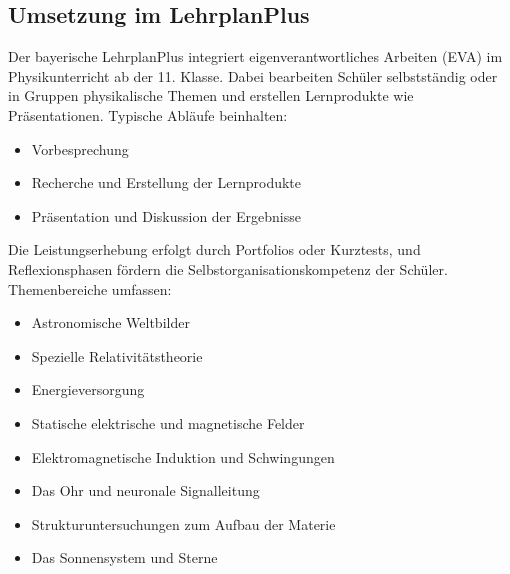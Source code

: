 \subsection{Umsetzung im LehrplanPlus}
Der bayerische LehrplanPlus integriert eigenverantwortliches Arbeiten (EVA) im Physikunterricht ab der 11. Klasse. Dabei bearbeiten Sch\"uler selbstst\"andig oder in Gruppen physikalische Themen und erstellen Lernprodukte wie Pr\"asentationen. Typische Abl\"aufe beinhalten:

\begin{itemize}
	\item Vorbesprechung
	\item Recherche und Erstellung der Lernprodukte
	\item Pr\"asentation und Diskussion der Ergebnisse
\end{itemize}

Die Leistungserhebung erfolgt durch Portfolios oder Kurztests, und Reflexionsphasen fördern die Selbstorganisationskompetenz der Sch\"uler. Themenbereiche umfassen:

\begin{itemize}
	\item Astronomische Weltbilder
	\item Spezielle Relativitätstheorie
	\item Energieversorgung
	\item Statische elektrische und magnetische Felder
	\item Elektromagnetische Induktion und Schwingungen
	\item Das Ohr und neuronale Signalleitung
	\item Strukturuntersuchungen zum Aufbau der Materie
	\item Das Sonnensystem und Sterne
\end{itemize}